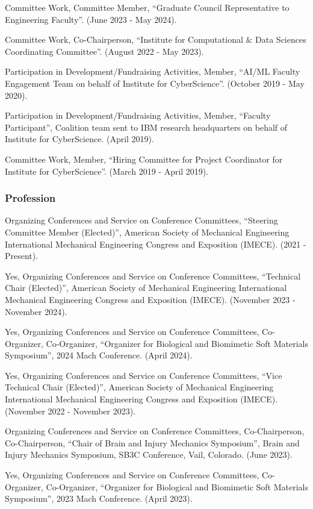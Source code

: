 \documentclass[11pt]{article}
\begin{document}
Committee Work, Committee Member, ``Graduate Council
Representative to Engineering Faculty''. 
(June 2023 - May 2024).

Committee Work, Co-Chairperson, ``Institute for Computational
\& Data Sciences Coordinating Committee''. 
(August 2022 - May 2023).

Participation in Development/Fundraising Activities, Member,
``AI/ML Faculty Engagement Team on behalf of Institute for CyberScience''.
(October 2019 - May 2020).

Participation in Development/Fundraising Activities, Member,
``Faculty Participant'', Coalition team sent to IBM research headquarters
on behalf of Institute for CyberScience. 
(April 2019).

Committee Work, Member, ``Hiring Committee for Project
Coordinator for Institute for CyberScience''. 
(March 2019 - April 2019).

\subsubsection{Profession}\label{profession}

Organizing Conferences and Service on Conference Committees,
``Steering Committee Member (Elected)'', American Society of Mechanical
Engineering International Mechanical Engineering Congress and Exposition
(IMECE). 
(2021 - Present).

Yes, Organizing Conferences and Service on Conference
Committees, ``Technical Chair (Elected)'', American Society of Mechanical
Engineering International Mechanical Engineering Congress and Exposition
(IMECE). 
(November 2023 - November 2024).

Yes, Organizing Conferences and Service on Conference
Committees, Co-Organizer, Co-Organizer, ``Organizer for Biological and
Biomimetic Soft Materials Symposium'', 2024 Mach Conference. 
(April
2024).

Yes, Organizing Conferences and Service on Conference
Committees, ``Vice Technical Chair (Elected)'', American Society of
Mechanical Engineering International Mechanical Engineering Congress and
Exposition (IMECE). 
(November 2022 - November 2023).

Organizing Conferences and Service on Conference Committees,
Co-Chairperson, Co-Chairperson, ``Chair of Brain and Injury Mechanics
Symposium'', Brain and Injury Mechanics Symposium, SB3C Conference, Vail,
Colorado. 
(June 2023).

Yes, Organizing Conferences and Service on Conference
Committees, Co-Organizer, Co-Organizer, ``Organizer for Biological and
Biomimetic Soft Materials Symposium'', 2023 Mach Conference. 
(April
2023).
\end{document}
